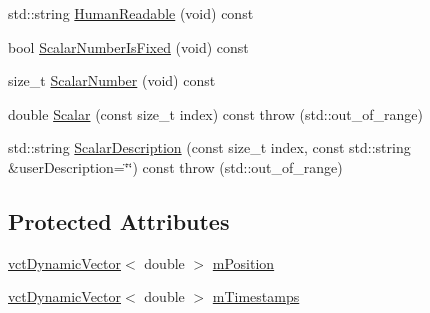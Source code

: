 \begin{DoxyCompactItemize}
\item 
std\-::string \hyperlink{classprm_position_joint_get_a370d5310b2185390226577b59ef6800b}{Human\-Readable} (void) const 
\item 
bool \hyperlink{classprm_position_joint_get_a04f68a2a3a9becd6264936929a7dea42}{Scalar\-Number\-Is\-Fixed} (void) const 
\item 
size\-\_\-t \hyperlink{classprm_position_joint_get_acfa7787de95b0bc75f14235491774711}{Scalar\-Number} (void) const 
\item 
double \hyperlink{classprm_position_joint_get_ad32c5d676d6e46fb5e2ad287ba9f2332}{Scalar} (const size\-\_\-t index) const   throw (std\-::out\-\_\-of\-\_\-range)
\item 
std\-::string \hyperlink{classprm_position_joint_get_a84bf96f535df72eeb8481cbd9bacc55e}{Scalar\-Description} (const size\-\_\-t index, const std\-::string \&user\-Description=\char`\"{}\char`\"{}) const   throw (std\-::out\-\_\-of\-\_\-range)
\end{DoxyCompactItemize}
\subsection*{Protected Attributes}
\begin{DoxyCompactItemize}
\item 
\hyperlink{classvct_dynamic_vector}{vct\-Dynamic\-Vector}$<$ double $>$ \hyperlink{classprm_position_joint_get_a9a7bd809fc2805e1902de89a108331ca}{m\-Position}
\item 
\hyperlink{classvct_dynamic_vector}{vct\-Dynamic\-Vector}$<$ double $>$ \hyperlink{classprm_position_joint_get_a1a391f7e9a645609367916dc2ae7683c}{m\-Timestamps}
\end{DoxyCompactItemize}



